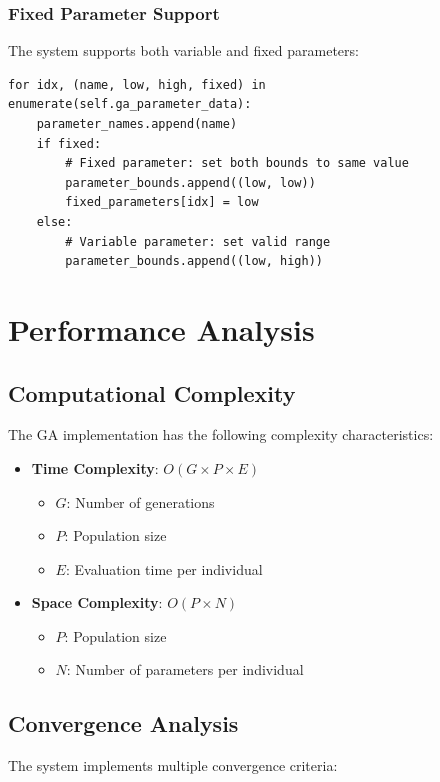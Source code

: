 \documentclass[12pt,a4paper]{article}
\begin{document}
\subsubsection{Fixed Parameter Support}
The system supports both variable and fixed parameters:

\begin{lstlisting}[caption=Parameter Handling]
for idx, (name, low, high, fixed) in enumerate(self.ga_parameter_data):
    parameter_names.append(name)
    if fixed:
        # Fixed parameter: set both bounds to same value
        parameter_bounds.append((low, low))
        fixed_parameters[idx] = low
    else:
        # Variable parameter: set valid range
        parameter_bounds.append((low, high))
\end{lstlisting}

\section{Performance Analysis}

\subsection{Computational Complexity}
The GA implementation has the following complexity characteristics:

\begin{itemize}
    \item \textbf{Time Complexity}: $O(G \times P \times E)$
    \begin{itemize}
        \item $G$: Number of generations
        \item $P$: Population size
        \item $E$: Evaluation time per individual
    \end{itemize}
    \item \textbf{Space Complexity}: $O(P \times N)$
    \begin{itemize}
        \item $P$: Population size
        \item $N$: Number of parameters per individual
    \end{itemize}
\end{itemize}

\subsection{Convergence Analysis}
The system implements multiple convergence criteria:
\end{document}

